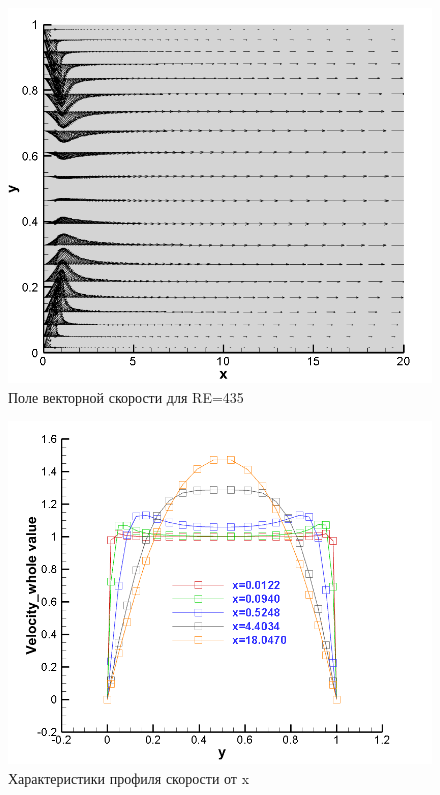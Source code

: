 \documentclass[12pt, a4paper]{article}
\begin{document}
\begin{figure}[H]
    \centering
    \includegraphics[scale = 0.6]{figure/RE135_vector.png}
    \caption{Поле векторной скорости для RE=435}
    \label{pic3}
\end{figure}

\begin{figure}[H]
    \centering
    \includegraphics[scale = 0.6]{figure/RE135_speed.png}
    \caption{Характеристики профиля скорости от x}
    \label{pic4}
\end{figure}
\end{document}
